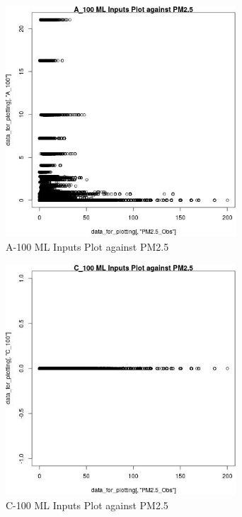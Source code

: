 \begin{figure} 
\centering  
\includegraphics[width=0.77\textwidth]{Code_Outputs/ML_input_report_ML_input_PM25_Step5_part_d_de_duplicated_aves_ML_input_A_100vPM25_Obs.jpg} 
\caption{\label{fig:ML_input_report_ML_input_PM25_Step5_part_d_de_duplicated_aves_ML_inputA_100vPM25_Obs}A-100 ML Inputs Plot against PM2.5} 
\end{figure} 
 

\begin{figure} 
\centering  
\includegraphics[width=0.77\textwidth]{Code_Outputs/ML_input_report_ML_input_PM25_Step5_part_d_de_duplicated_aves_ML_input_C_100vPM25_Obs.jpg} 
\caption{\label{fig:ML_input_report_ML_input_PM25_Step5_part_d_de_duplicated_aves_ML_inputC_100vPM25_Obs}C-100 ML Inputs Plot against PM2.5} 
\end{figure} 
 

